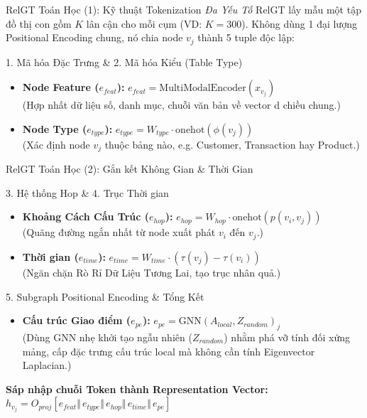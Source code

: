 \documentclass[aspectratio=169,11pt]{beamer}
\begin{document}
\begin{frame}{RelGT Toán Học (1): Kỹ thuật Tokenization \textit{Đa Yếu Tố}}
RelGT lấy mẫu một tập đồ thị con gồm $K$ lân cận cho mỗi cụm (VD: $K=300$). Không dùng 1 đại lượng Positional Encoding chung, nó chia node $v_j$ thành 5 tuple độc lập:

\begin{block}{1. Mã hóa Đặc Trưng \& 2. Mã hóa Kiểu (Table Type)}
\begin{itemize}
    \item \textbf{Node Feature ($e_{feat}$):} 
    $e_{feat} = \text{MultiModalEncoder}(x_{v_j})$
    \\ \small (Hợp nhất dữ liệu số, danh mục, chuỗi văn bản về vector d chiều chung.)
    \item \textbf{Node Type ($e_{type}$):}
    $e_{type} = W_{type} \cdot \text{onehot}(\phi(v_j))$
    \\ \small (Xác định node $v_j$ thuộc bảng nào, e.g. Customer, Transaction hay Product.)
\end{itemize}
\end{block}

\end{frame}

\begin{frame}{RelGT Toán Học (2): Gắn kết Không Gian \& Thời Gian}
\begin{block}{3. Hệ thống Hop \& 4. Trục Thời gian}
\begin{itemize}
    \item \textbf{Khoảng Cách Cấu Trúc ($e_{hop}$):} 
    $e_{hop} = W_{hop} \cdot \text{onehot}(p(v_i, v_j))$
    \\ \small (Quãng đường ngắn nhất từ node xuất phát $v_i$ đến $v_j$.)
    \item \textbf{Thời gian ($e_{time}$):}
    $e_{time} = W_{time} \cdot (\tau(v_j) - \tau(v_i))$
    \\ \small (Ngăn chặn Rò Rỉ Dữ Liệu Tương Lai, tạo trục nhân quả.)
\end{itemize}
\end{block}

\begin{block}{5. Subgraph Positional Encoding \& Tổng Kết}
\begin{itemize}
    \item \textbf{Cấu trúc Giao điểm ($e_{pe}$):} 
    $e_{pe} = \text{GNN}(A_{local}, Z_{random})_j$
    \\ \small (Dùng GNN nhẹ khởi tạo ngẫu nhiên ($Z_{random}$) nhằm phá vỡ tính đối xứng mảng, cấp đặc trưng cấu trúc local mà không cần tính Eigenvector Laplacian.)
\end{itemize}
\textbf{Sáp nhập chuỗi Token thành Representation Vector:} \\
\centering $h_{v_j} = O_{proj} [e_{feat} \Vert \,e_{type} \Vert \,e_{hop} \Vert \,e_{time} \Vert \,e_{pe}]$
\end{block}
\end{frame}
\end{document}
